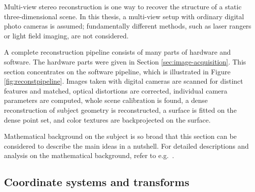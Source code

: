 Multi-view stereo reconstruction is one way to recover the structure of a static three-dimensional scene.
In this thesis, a multi-view setup with ordinary digital photo cameras is assumed;
fundamentally different methods, such as laser rangers or light field imaging, are not considered.

A complete reconstruction pipeline consists of many parts of hardware and software.
The hardware parts were given in Section \ref{sec:image-acquisition}.
This section concentrates on the software pipeline, which is illustrated in Figure \ref{fig:reconstpipeline}.
Images taken with digital cameras are scanned for distinct features and matched, optical distortions are corrected, individual camera parameters are computed, whole scene calibration is found, a dense reconstruction of subject geometry is reconstructed, a surface is fitted on the dense point set, and color textures are backprojected on the surface.

Mathematical background on the subject is so broad that this section can be considered to describe the main ideas in a nutshell.
For detailed descriptions and analysis on the mathematical background, refer to e.g.\ \cite{hartley03multiview,heyden2005multiple,szeliski10vision}.





\subsection{Coordinate systems and transforms} \label{sec:coord} %

